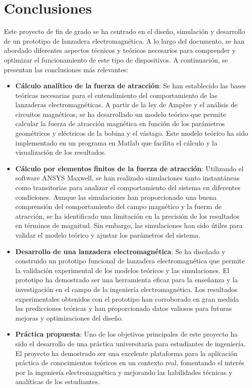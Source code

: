 \section{Conclusiones}
\label{sec:conclusiones}

Este proyecto de fin de grado se ha centrado en el diseño, simulación y desarrollo de un prototipo de lanzadera electromagnética. A lo largo del documento, se han abordado diferentes aspectos técnicos y teóricos necesarios para comprender y optimizar el funcionamiento de este tipo de dispositivos. A continuación, se presentan las conclusiones más relevantes:

\begin{itemize}
    \item \textbf{Cálculo analítico de la fuerza de atracción}: Se han establecido las bases teóricas necesarias para el entendimiento del comportamiento de las lanzaderas electromagnéticas. A partir de la ley de Ampère y el análisis de circuitos magnéticos, se ha desarrollado un modelo teórico que permite calcular la fuerza de atracción magnética en función de los parámetros geométricos y eléctricos de la bobina y el vástago. Este modelo teórico ha sido implementado en un programa en Matlab que facilita el cálculo y la visualización de los resultados.
    \item \textbf{Cálculo por elementos finitos de la fuerza de atracción}: Utilizando el software ANSYS Maxwell, se han realizado simulaciones tanto instantáneas como transitorias para analizar el comportamiento del sistema en diferentes condiciones. Aunque las simulaciones han proporcionado una buena comprensión del comportamiento del campo magnético y la fuerza de atracción, se ha identificado una limitación en la precisión de los resultados en términos de magnitud. Sin embargo, las simulaciones han sido útiles para validar el modelo teórico y ajustar los parámetros del sistema.
    \item \textbf{Desarrollo de una lanzadera electromagnética}: Se ha diseñado y construido un prototipo funcional de lanzadera electromagnética que permite la validación experimental de los modelos teóricos y las simulaciones. El prototipo ha demostrado ser una herramienta eficaz para la enseñanza y la investigación en el campo de la ingeniería electromagnética. Los resultados experimentales obtenidos con el prototipo han corroborado en gran medida las predicciones teóricas y han proporcionado datos valiosos para futuras mejoras y optimizaciones del diseño.
    \item \textbf{Práctica propuesta}: Uno de los objetivos principales de este proyecto ha sido el desarrollo de una práctica universitaria para estudiantes de ingeniería. El proyecto ha demostrado ser una excelente plataforma para la aplicación práctica de conocimientos teóricos en un contexto real, fomentando el interés por la ingeniería electromagnética y mejorando las habilidades técnicas y analíticas de los estudiantes.
\end{itemize}

